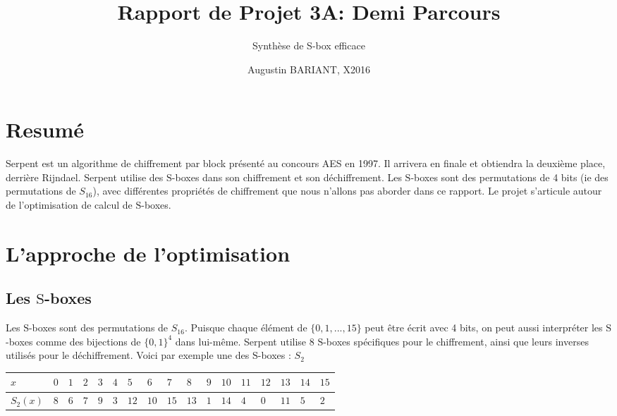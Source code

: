 \documentclass{article}
\title{Rapport de Projet 3A: Demi Parcours}
\subtitle{Synthèse de S-box efficace}
\author{Augustin BARIANT, X2016}
\begin{document}
\maketitle
\tableofcontents
\section{Resumé}



\bigbreak

Serpent est un algorithme de chiffrement par block présenté au concours AES en 1997. Il arrivera en finale et obtiendra la deuxième place, derrière Rijndael. Serpent utilise des $\mathrm{S}$-boxes dans son chiffrement et son déchiffrement. Les $\mathrm{S}$-boxes sont des permutations de 4 bits (ie des permutations de $S_{16}$), avec différentes propriétés de chiffrement que nous n'allons pas aborder dans ce rapport. Le projet s'articule autour de l'optimisation de calcul de $\mathrm{S}$-boxes. 


\section{L'approche de l'optimisation}

\subsection{Les $\mathrm{S}$-boxes}

Les $\mathrm{S}$-boxes sont des permutations de $S_{16}$. Puisque chaque élément de $\{0,1,...,15\}$ peut être écrit avec 4 bits, on peut aussi interpréter les $\mathrm{S}$-boxes comme des bijections de $\{0,1\}^{4}$ dans lui-même. Serpent utilise 8 $\mathrm{S}$-boxes spécifiques pour le chiffrement, ainsi que leurs inverses utilisés pour le déchiffrement. Voici par exemple une des $\mathrm{S}$-boxes : $S_{2}$
\medbreak
\begin{center}
\begin{tabular}{|l|l|l|l|l|l|l|l|l|l|l|l|l|l|l|l|l|}
\hline
\multicolumn{1}{|l|}{$x$}&	\multicolumn{1}{|l|}{ $0$}&	\multicolumn{1}{|l|}{ $1$}&	\multicolumn{1}{|l|}{ $2$}&	\multicolumn{1}{|l|}{ $3$}&	\multicolumn{1}{|l|}{ $4$}&	\multicolumn{1}{|l|}{ $5$}&	\multicolumn{1}{|l|}{ $6$}&	\multicolumn{1}{|l|}{ $7$}&	\multicolumn{1}{|l|}{ $8$}&	\multicolumn{1}{|l|}{ $9$}&	\multicolumn{1}{|l|}{ $10$}&	\multicolumn{1}{|l|}{ $11$}&	\multicolumn{1}{|l|}{ $12$}&	\multicolumn{1}{|l|}{ $13$}&	\multicolumn{1}{|l|}{ $14$}&	\multicolumn{1}{|l|}{ $15$}	\\
\hline
\multicolumn{1}{|l|}{ $S_{2}(x)$}&	\multicolumn{1}{|l|}{ $8$}&	\multicolumn{1}{|l|}{ $6$}&	\multicolumn{1}{|l|}{ $7$}&	\multicolumn{1}{|l|}{ $9$}&	\multicolumn{1}{|l|}{ $3$}&	\multicolumn{1}{|l|}{ $12$}&	\multicolumn{1}{|l|}{ $10$}&	\multicolumn{1}{|l|}{ $15$}&	\multicolumn{1}{|l|}{ $13$}&	\multicolumn{1}{|l|}{ $1$}&	\multicolumn{1}{|l|}{ $14$}&	\multicolumn{1}{|l|}{ $4$}&	\multicolumn{1}{|l|}{ $0$}&	\multicolumn{1}{|l|}{ $11$}&	\multicolumn{1}{|l|}{ $5$}&	\multicolumn{1}{|l|}{ $2$}	\\
\hline

\end{tabular}
\end{center}
\medbreak
\end{document}
